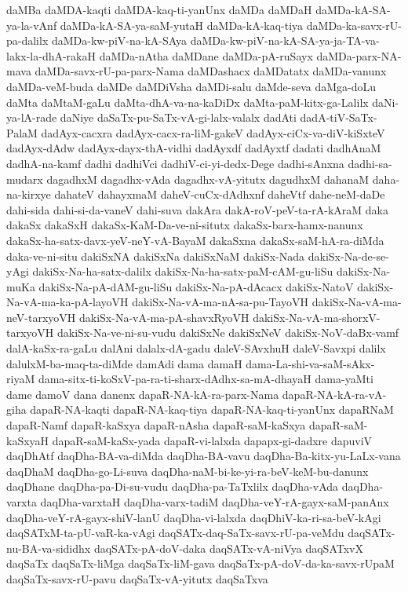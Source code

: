 {daMBa
daMDA-kaqti
daMDA-kaq-ti-yanUnx
daMDa
daMDaH
daMDa-kA-SA-ya-la-vAnf
daMDa-kA-SA-ya-saM-yutaH
daMDa-kA-kaq-tiya
daMDa-ka-savx-rU-pa-dalilx
daMDa-kw-piV-na-kA-SAya
daMDa-kw-piV-na-kA-SA-ya-ja-TA-va-lakx-la-dhA-rakaH
daMDa-nAtha
daMDane
daMDa-pA-ruSayx
daMDa-parx-NA-mava
daMDa-savx-rU-pa-parx-Nama
daMDashacx
daMDatatx
daMDa-vanunx
daMDa-veM-buda
daMDe
daMDiVsha
daMDi-salu
daMde-seva
daMga-doLu
daMta
daMtaM-gaLu
daMta-dhA-va-na-kaDiDx
daMta-paM-kitx-ga-Lalilx
daNi-ya-lA-rade
daNiye
daSaTx-pu-SaTx-vA-gi-lalx-valalx
dadAti
dadA-tiV-SaTx-PalaM
dadAyx-cacxra
dadAyx-cacx-ra-liM-gakeV
dadAyx-ciCx-va-diV-kiSxteV
dadAyx-dAdw
dadAyx-dayx-thA-vidhi
dadAyxdf
dadAyxtf
dadati
dadhAnaM
dadhA-na-kamf
dadhi
dadhiVci
dadhiV-ci-yi-dedx-Dege
dadhi-sAnxna
dadhi-sa-mudarx
dagadhxM
dagadhx-vAda
dagadhx-vA-yitutx
dagudhxM
dahanaM
daha-na-kirxye
dahateV
dahayxmaM
daheV-cuCx-dAdhxnf
daheVtf
dahe-neM-daDe
dahi-sida
dahi-si-da-vaneV
dahi-suva
dakAra
dakA-roV-peV-ta-rA-kAraM
daka
dakaSx
dakaSxH
dakaSx-KaM-Da-ve-ni-situtx
dakaSx-barx-hamx-nanunx
dakaSx-ha-satx-davx-yeV-neY-vA-BayaM
dakaSxna
dakaSx-saM-hA-ra-diMda
daka-ve-ni-situ
dakiSxNA
dakiSxNa
dakiSxNaM
dakiSx-Nada
dakiSx-Na-de-se-yAgi
dakiSx-Na-ha-satx-dalilx
dakiSx-Na-ha-satx-paM-cAM-gu-liSu
dakiSx-Na-muKa
dakiSx-Na-pA-dAM-gu-liSu
dakiSx-Na-pA-dAcacx
dakiSx-NatoV
dakiSx-Na-vA-ma-ka-pA-layoVH
dakiSx-Na-vA-ma-nA-sa-pu-TayoVH
dakiSx-Na-vA-ma-neV-tarxyoVH
dakiSx-Na-vA-ma-pA-shavxRyoVH
dakiSx-Na-vA-ma-shorxV-tarxyoVH
dakiSx-Na-ve-ni-su-vudu
dakiSxNe
dakiSxNeV
dakiSx-NoV-daBx-vamf
dalA-kaSx-ra-gaLu
dalAni
dalalx-dA-gadu
daleV-SAvxhuH
daleV-Savxpi
dalilx
dalulxM-ba-maq-ta-diMde
damAdi
dama
damaH
dama-La-shi-va-saM-sAkx-riyaM
dama-sitx-ti-koSxV-pa-ra-ti-sharx-dAdhx-sa-mA-dhayaH
dama-yaMti
dame
damoV
dana
danenx
dapaR-NA-kA-ra-parx-Nama
dapaR-NA-kA-ra-vA-giha
dapaR-NA-kaqti
dapaR-NA-kaq-tiya
dapaR-NA-kaq-ti-yanUnx
dapaRNaM
dapaR-Namf
dapaR-kaSxya
dapaR-nAsha
dapaR-saM-kaSxya
dapaR-saM-kaSxyaH
dapaR-saM-kaSx-yada
dapaR-vi-lalxda
dapapx-gi-dadxre
dapuviV
daqDhAtf
daqDha-BA-va-diMda
daqDha-BA-vavu
daqDha-Ba-kitx-yu-LaLx-vana
daqDhaM
daqDha-go-Li-suva
daqDha-naM-bi-ke-yi-ra-beV-keM-bu-danunx
daqDhane
daqDha-pa-Di-su-vudu
daqDha-pa-TaTxlilx
daqDha-vAda
daqDha-varxta
daqDha-varxtaH
daqDha-varx-tadiM
daqDha-veY-rA-gayx-saM-panAnx
daqDha-veY-rA-gayx-shiV-lanU
daqDha-vi-lalxda
daqDhiV-ka-ri-sa-beV-kAgi
daqSATxM-ta-pU-vaR-ka-vAgi
daqSATx-daq-SaTx-savx-rU-pa-veMdu
daqSATx-nu-BA-va-sididhx
daqSATx-pA-doV-daka
daqSATx-vA-niVya
daqSATxvX
daqSaTx
daqSaTx-liMga
daqSaTx-liM-gava
daqSaTx-pA-doV-da-ka-savx-rUpaM
daqSaTx-savx-rU-pavu
daqSaTx-vA-yitutx
daqSaTxva
}
